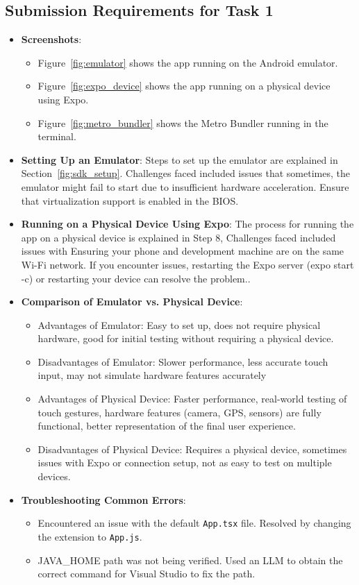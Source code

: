\documentclass{article}
\begin{document}
\subsection{Submission Requirements for Task 1}
\begin{itemize}
    \item \textbf{Screenshots}: 
    \begin{itemize}
        \item Figure~\ref{fig:emulator} shows the app running on the Android emulator.
        \item Figure~\ref{fig:expo_device} shows the app running on a physical device using Expo.
        \item Figure~\ref{fig:metro_bundler} shows the Metro Bundler running in the terminal.
    \end{itemize}
    \item \textbf{Setting Up an Emulator}: Steps to set up the emulator are explained in Section~\ref{fig:sdk_setup}. Challenges faced included issues that sometimes, the emulator might fail to start due to insufficient hardware acceleration. Ensure that virtualization support is enabled in the BIOS.
    \item \textbf{Running on a Physical Device Using Expo}: The process for running the app on a physical device is explained in Step 8, Challenges faced included issues with Ensuring your phone and development machine are on the same Wi-Fi network. If you encounter issues, restarting the Expo server (expo start -c) or restarting your device can resolve the problem..
    \item \textbf{Comparison of Emulator vs. Physical Device}: 
    \begin{itemize}
        \item Advantages of Emulator: Easy to set up, does not require physical hardware, good for initial testing without requiring a physical device.
        \item Disadvantages of Emulator: Slower performance, less accurate touch input, may not simulate hardware features accurately 
        \item Advantages of Physical Device: Faster performance, real-world testing of touch gestures, hardware features (camera, GPS, sensors) are fully functional, better representation of the final user experience.
        \item Disadvantages of Physical Device: Requires a physical device, sometimes issues with Expo or connection setup, not as easy to test on multiple devices.
    \end{itemize}
    \item \textbf{Troubleshooting Common Errors}: 
    \begin{itemize}
        \item Encountered an issue with the default \texttt{App.tsx} file. Resolved by changing the extension to \texttt{App.js}.
        \item JAVA\_HOME path was not being verified. Used an LLM to obtain the correct command for Visual Studio to fix the path.
    \end{itemize}
\end{itemize}
\end{document}

